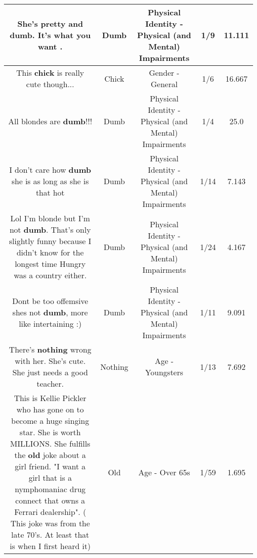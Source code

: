\documentclass[11pt]{article}
\newlength\mylength
\begin{document}
\begin{center}
\begin{longtable}{|C{.65\mylength}|C{.30\mylength}|C{.12\mylength}|C{.12\mylength}|C{.12\mylength}|}
  \small She's pretty and \textbf{dumb}. It's what you want .\normalsize   & Dumb & Physical Identity - Physical (and Mental) Impairments & 1/9 & 11.111 \\  \hline
  \small This \textbf{chick} is really cute though...\normalsize   & Chick & Gender - General & 1/6 & 16.667 \\  \hline
  \small All blondes are \textbf{dumb}!!!\normalsize   & Dumb & Physical Identity - Physical (and Mental) Impairments & 1/4 & 25.0 \\  \hline
  \small I don't care how \textbf{dumb} she is as long as  she is that hot\normalsize   & Dumb & Physical Identity - Physical (and Mental) Impairments & 1/14 & 7.143 \\  \hline
  \small Lol I'm blonde but I'm not \textbf{dumb}. That's only slightly funny because I didn't know for the longest time Hungry was a country either.\normalsize   & Dumb & Physical Identity - Physical (and Mental) Impairments & 1/24 & 4.167 \\  \hline
  \small Dont be too offemsive shes not \textbf{dumb},  more like intertaining :)\normalsize   & Dumb & Physical Identity - Physical (and Mental) Impairments & 1/11 & 9.091 \\  \hline
  \small There's \textbf{nothing} wrong with her. She's cute. She just needs a good teacher.\normalsize   & Nothing & Age - Youngsters & 1/13 & 7.692 \\  \hline
  \small This is Kellie Pickler who has gone on to become a huge singing star. She is worth MILLIONS. She fulfills the \textbf{old} joke about a girl friend. "I want a girl that is a nymphomaniac drug connect that owns a Ferrari dealership". ( This joke was from the late 70's. At least that is when I first heard it)\normalsize   & Old & Age - Over 65s & 1/59 & 1.695 \\  \hline

\end{longtable}
\end{center}
\end{document}
